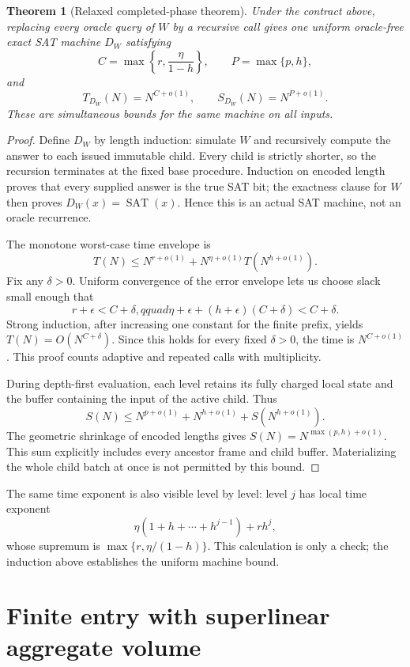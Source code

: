 \documentclass[11pt]{article}
\newtheorem{theorem}{Theorem}
\newcommand{\SAT}{\operatorname{SAT}}
\begin{document}
\begin{theorem}[Relaxed completed-phase theorem]
Under the contract above, replacing every oracle query of $W$ by a recursive
call gives one uniform oracle-free exact SAT machine $D_W$ satisfying
\[
 C=\max\left\{r,\frac{\eta}{1-h}\right\},\qquad
 P=\max\{p,h\},
\]
and
\[
 T_{D_W}(N)=N^{C+o(1)},\qquad S_{D_W}(N)=N^{P+o(1)}.
\]
These are simultaneous bounds for the same machine on all inputs.
\end{theorem}

\begin{proof}
Define $D_W$ by length induction: simulate $W$ and recursively compute the
answer to each issued immutable child.  Every child is strictly shorter, so
the recursion terminates at the fixed base procedure.  Induction on encoded
length proves that every supplied answer is the true SAT bit; the exactness
clause for $W$ then proves $D_W(x)=\SAT(x)$.  Hence this is an actual SAT
machine, not an oracle recurrence.

The monotone worst-case time envelope is
\[
 T(N)\le N^{r+o(1)}+N^{\eta+o(1)}
       T\!\left(N^{h+o(1)}\right).
\]
Fix any $\delta>0$.  Uniform convergence of the error envelope lets us choose
slack small enough that
\[
 r+\epsilon<C+\delta,qquad
 \eta+\epsilon+(h+\epsilon)(C+\delta)<C+\delta.
\]
Strong induction, after increasing one constant for the finite prefix, yields
$T(N)=O(N^{C+\delta})$.  Since this holds for every fixed $\delta>0$, the
time is $N^{C+o(1)}$.  This proof counts adaptive and repeated calls with
multiplicity.

During depth-first evaluation, each level retains its fully charged local
state and the buffer containing the input of the active child.  Thus
\[
 S(N)\le N^{p+o(1)}+N^{h+o(1)}+S(N^{h+o(1)}).
\]
The geometric shrinkage of encoded lengths gives
$S(N)=N^{\max(p,h)+o(1)}$.  This sum explicitly includes every ancestor
frame and child buffer.  Materializing the whole child batch at once is not
permitted by this bound.
\end{proof}

The same time exponent is also visible level by level: level $j$ has local
time exponent
\[
 \eta(1+h+\cdots+h^{j-1})+rh^j,
\]
whose supremum is $\max\{r,\eta/(1-h)\}$.  This calculation is only a check;
the induction above establishes the uniform machine bound.

\section{Finite entry with superlinear aggregate volume}
\end{document}
